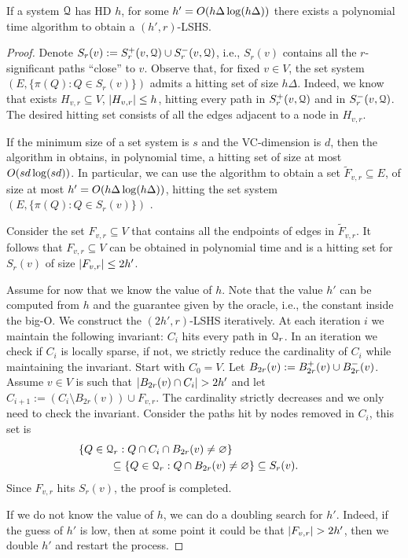 \begin{proposition}
If a system $\mathcal{Q}$ has HD $h$, for some $h'=O(h\Delta\log(h\Delta))$ there exists a polynomial time algorithm to obtain a $(h',r)$-LSHS.	
\end{proposition}
\begin{proof}
Denote $S_r(v):=S^+_r(v,\mathcal{Q})\cup S^-_r(v,\mathcal{Q})$, i.e., $S_r(v)$ contains all the $r$-significant paths ``close'' to $v$. 
Observe that, for fixed $v\in V$, the set system $(E,\{\pi(Q):Q \in S_r(v)\})$ admits a hitting set of size $h\Delta$.
Indeed, we know that exists $H_{v,r}\subseteq V$, $\lvert H_{v,r}\rvert\leq h$, hitting every path in $S^+_r(v,\mathcal{Q})$ and in $S^-_r(v,\mathcal{Q})$.
The desired hitting set consists of all the edges adjacent to a node in $H_{v,r}$.

If the minimum size of a set system is $s$ and the VC-dimension is $d$, then the algorithm in \cite{vc_dim_hitting} obtains, in polynomial time, a hitting set of size at most $O(sd\log(sd))$.
In particular, we can use the algorithm to obtain a set $\tilde F_{v,r}\subseteq E$, of size at most $h'=O(h\Delta\log(h\Delta))$, hitting the set system $(E,\{\pi(Q):Q \in S_r(v)\})$ .

Consider the set $F_{v,r}\subseteq V$ that contains all the endpoints of edges in $\tilde F_{v,r}$.
It follows that $F_{v,r}\subseteq V$ can be obtained in polynomial time and is a hitting set for $S_r(v)$ of size $\lvert F_{v,r}\rvert\leq 2h'$.

Assume for now that we know the value of $h$.
Note that the value $h'$ can be computed from $h$ and the guarantee given by the oracle, i.e., the constant inside the big-O.
We construct the $(2h',r)$-LSHS iteratively.
At each iteration $i$ we maintain the following invariant: $C_i$ hits every path in $\mathcal{Q}_r$.
In an iteration we check if $C_i$ is locally sparse, if not, we strictly reduce the cardinality of $C_i$ while maintaining the invariant.
Start with $C_0=V$. 
Let $B_{2r}(v):=B^+_{2r}(v)\cup B^-_{2r}(v)$.
Assume $v\in V$ is such that $\lvert B_{2r}(v)\cap C_i\rvert>2h'$ and let $C_{i+1}:=(C_i\setminus B_{2r}(v))\cup F_{v,r} $.
The cardinality strictly decreases and we only need to check the invariant.
Consider the paths hit by nodes removed in $C_i$, this set is
\begin{align*}
&\hspace{-1cm}\{Q\in\calQ_r: Q\cap C_i\cap B_{2r}(v)\neq \varnothing\}\\
&\subseteq \{Q\in\calQ_r: Q\cap B_{2r}(v)\neq \varnothing\} \subseteq S_r(v).
\end{align*}
Since $F_{v,r}$ hits $S_r(v)$, the proof is completed.

If we do not know the value of $h$, we can do a doubling search for $h'$. 
Indeed, if the guess of $h'$ is low, then at some point it could be that $\lvert F_{v,r}\rvert>2h'$, then we double $h'$ and restart the process.
\end{proof}
